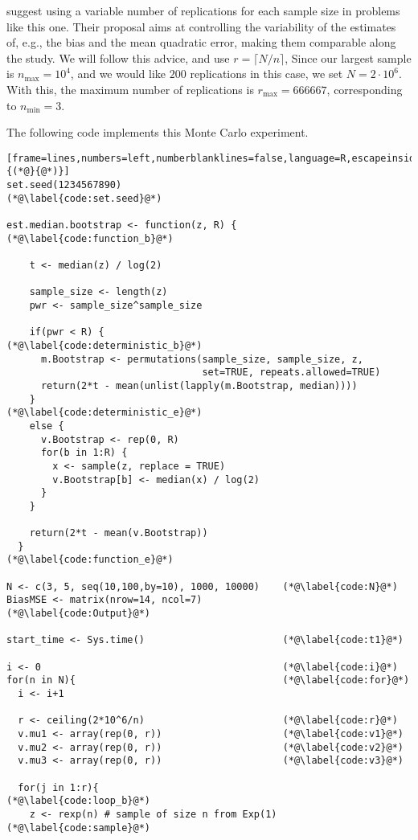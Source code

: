 \citet{busto92} suggest using a variable number of replications for each sample size in problems like this one.
Their proposal aims at controlling the variability of the estimates of, e.g., the bias and the mean quadratic error, making them comparable along the study.
We will follow this advice, and use $r=\lceil N/n\rceil$, 
Since our largest sample is $n_{\max}=10^4$, and we would like $200$ replications in this case, we set $N=2\cdot 10^6$.
With this, the maximum number of replications is $r_{\max}=666667$, corresponding to $n_{\min}=3$.

The following code implements this Monte Carlo experiment.

\begin{lstlisting}[frame=lines,numbers=left,numberblanklines=false,language=R,escapeinside={(*@}{@*)}]
set.seed(1234567890)							(*@\label{code:set.seed}@*)

est.median.bootstrap <- function(z, R) {		(*@\label{code:function_b}@*)
  
    t <- median(z) / log(2)
    
    sample_size <- length(z)
    pwr <- sample_size^sample_size
    
    if(pwr < R) {													(*@\label{code:deterministic_b}@*)
      m.Bootstrap <- permutations(sample_size, sample_size, z, 
                                  set=TRUE, repeats.allowed=TRUE)
      return(2*t - mean(unlist(lapply(m.Bootstrap, median))))
    } 																(*@\label{code:deterministic_e}@*)
    else {
      v.Bootstrap <- rep(0, R)
      for(b in 1:R) {
        x <- sample(z, replace = TRUE)
        v.Bootstrap[b] <- median(x) / log(2)
      }
    }
    
    return(2*t - mean(v.Bootstrap))
  }												(*@\label{code:function_e}@*)

N <- c(3, 5, seq(10,100,by=10), 1000, 10000)	(*@\label{code:N}@*)
BiasMSE <- matrix(nrow=14, ncol=7)				(*@\label{code:Output}@*)

start_time <- Sys.time()						(*@\label{code:t1}@*)

i <- 0											(*@\label{code:i}@*)
for(n in N){									(*@\label{code:for}@*)
  i <- i+1
  
  r <- ceiling(2*10^6/n)						(*@\label{code:r}@*)
  v.mu1 <- array(rep(0, r))						(*@\label{code:v1}@*)
  v.mu2 <- array(rep(0, r))						(*@\label{code:v2}@*)
  v.mu3 <- array(rep(0, r))						(*@\label{code:v3}@*)
  
  for(j in 1:r){								(*@\label{code:loop_b}@*)
    z <- rexp(n) # sample of size n from Exp(1)	(*@\label{code:sample}@*)
    

\end{lstlisting}
